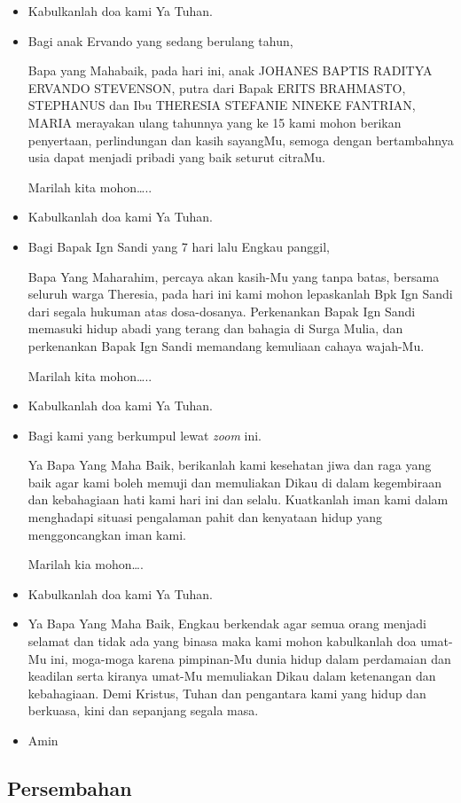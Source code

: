 \documentclass[a4paper,12pt]{article}
\newcommand{\BU}[1]{\begin{itemize} \item[U:] #1 \end{itemize}}
\newcommand{\BP}[1]{\begin{itemize} \item[P:] #1 \end{itemize}}
\begin{document}
\BU{Kabulkanlah doa kami Ya Tuhan.}

\BP{Bagi anak Ervando yang sedang berulang tahun,

Bapa yang Mahabaik, pada hari ini, anak JOHANES BAPTIS RADITYA ERVANDO STEVENSON,  putra dari Bapak ERITS BRAHMASTO, STEPHANUS dan Ibu  THERESIA STEFANIE NINEKE FANTRIAN, MARIA merayakan ulang tahunnya yang ke 15 kami mohon berikan penyertaan, perlindungan dan kasih sayangMu, semoga dengan bertambahnya usia  dapat menjadi pribadi yang baik seturut citraMu.

Marilah kita mohon{\dots}..}

\BU{Kabulkanlah doa kami Ya Tuhan.}

\BP{Bagi Bapak Ign Sandi yang 7 hari lalu Engkau panggil,

Bapa Yang Maharahim, percaya akan kasih-Mu yang tanpa batas, bersama seluruh warga Theresia, pada hari ini kami mohon lepaskanlah Bpk Ign Sandi dari segala hukuman atas dosa-dosanya. Perkenankan Bapak Ign Sandi memasuki hidup abadi yang terang dan bahagia di Surga Mulia, dan perkenankan Bapak Ign Sandi memandang kemuliaan cahaya wajah-Mu.

Marilah kita mohon{\dots}..}

\BU{Kabulkanlah doa kami Ya Tuhan.}

\BP{Bagi kami yang berkumpul lewat \textit{zoom} ini.

Ya Bapa Yang Maha Baik, berikanlah kami kesehatan jiwa dan raga yang baik agar kami boleh memuji dan memuliakan Dikau di
dalam kegembiraan dan kebahagiaan hati kami hari ini dan selalu. Kuatkanlah iman kami dalam menghadapi situasi
pengalaman pahit dan kenyataan hidup yang menggoncangkan iman kami.

Marilah kia mohon{\dots}.}

\BU{Kabulkanlah doa kami Ya Tuhan.}

\BP{Ya Bapa Yang Maha Baik, Engkau berkendak agar semua orang menjadi selamat dan tidak ada yang binasa maka kami mohon
kabulkanlah doa umat-Mu ini, moga-moga karena pimpinan-Mu dunia hidup dalam perdamaian dan keadilan serta kiranya
umat-Mu memuliakan Dikau dalam ketenangan dan kebahagiaan. Demi Kristus, Tuhan dan pengantara kami yang hidup dan
berkuasa, kini dan sepanjang segala masa.}

\BU{Amin}

\subsection*{Persembahan}
\end{document}
